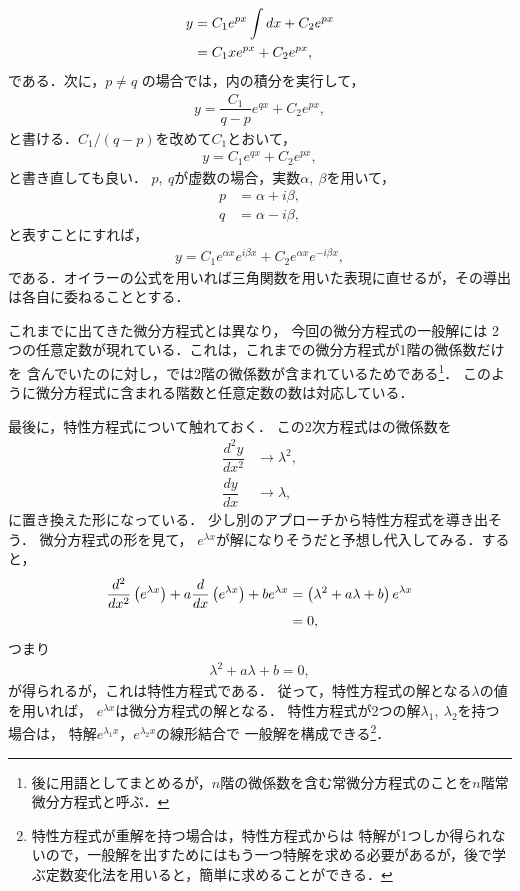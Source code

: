\begin{align}
  y &= C_{1}e^{px}\int dx + C_{2}e^{px} \notag \\
    &= C_{1} x e^{px} + C_{2}e^{px},
\end{align}
である．次に，$p \neq q$ の場合では，内の積分を実行して，
\begin{align}
 y = \dfrac{C_{1}}{q-p} e^{qx} + C_{2}e^{px},
\end{align}
と書ける．$C_1/\left(q -p \right)$を改めて$C_{1}$とおいて，
\begin{align}
 y = C_{1} e^{qx} + C_{2}e^{px}, 
\end{align}
と書き直しても良い．
$p,~q$が虚数の場合，実数$\alpha,~\beta$を用いて，
\begin{align}
  p &= \alpha + i \beta, \\
  q &= \alpha - i \beta, 
\end{align}
と表すことにすれば，
\begin{align}
  y = C_{1}e^{\alpha x}e^{i\beta x} + C_{2}e^{\alpha x}e^{-i\beta x},
\end{align}
である．オイラーの公式を用いれば三角関数を用いた表現に直せるが，その導出は各自に委ねることとする．

これまでに出てきた微分方程式とは異なり，
今回の微分方程式の一般解には
2つの任意定数が現れている．これは，これまでの微分方程式が1階の微係数だけを
含んでいたのに対し，では2階の微係数が含まれているためである\footnote{後に用語としてまとめるが，$n$階の微係数を含む常微分方程式のことを$n$階常微分方程式と呼ぶ．}．
このように微分方程式に含まれる階数と任意定数の数は対応している．

最後に，特性方程式について触れておく．
この2次方程式はの微係数を
\begin{align}
 \dfrac{d^{2}y}{dx^{2}} & \to \lambda^{2}, \\
 \dfrac{dy}{dx}         & \to \lambda, 
\end{align}
に置き換えた形になっている．
少し別のアプローチから特性方程式を導き出そう．
微分方程式の形を見て，
$e^{\lambda x}$が解になりそうだと予想し代入してみる．すると，
\begin{align}
  \dfrac{d^{2}}{dx^{2}}\left(e^{\lambda x}\right)+a\dfrac{d}{dx}\left(e^{\lambda x}\right)+be^{\lambda x} & =\left(\lambda^{2}+a\lambda+b\right)e^{\lambda x}\notag \\
 & =0,
\end{align}
つまり
\begin{align}
  \lambda^2 + a \lambda + b = 0, 
\end{align}
が得られるが，これは特性方程式である．
従って，特性方程式の解となる$\lambda$の値を用いれば，
$e^{\lambda x}$は微分方程式の解となる．
特性方程式が2つの解$\lambda_1,~\lambda_2$を持つ場合は，
特解$e^{\lambda_1 x}$，$e^{\lambda_2 x}$の線形結合で
一般解を構成できる\footnote{特性方程式が重解を持つ場合は，特性方程式からは
特解が1つしか得られないので，一般解を出すためにはもう一つ特解を求める必要があるが，後で学ぶ定数変化法を用いると，簡単に求めることができる．}．

